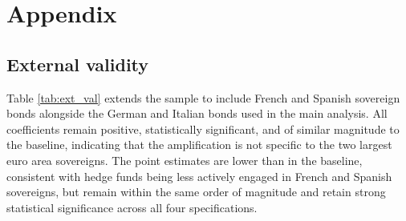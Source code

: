 \documentclass[english, 11pt, oneside]{article}
\renewcommand{\thesection}{\arabic{section}}
\renewcommand{\thesubsection}{\arabic{section}.\arabic{subsection}}
\renewcommand{\thetable}{\Roman{table}}
\begin{document}
\renewcommand{\thepage}{A -- \arabic{page}}
\setcounter{page}{1}

\setcounter{section}{0}
\setcounter{subsection}{0}

\renewcommand{\thesection}{\Alph{section}}
\renewcommand{\thesubsection}{\thesection\arabic{subsection}}

\setcounter{equation}{0}
\renewcommand{\theequation}{\thesection.\arabic{equation}}

\renewcommand\thetable{\Alph{section}\arabic{table}} \setcounter{table}{0}
\renewcommand\thefigure{\Alph{section}\arabic{figure}} \setcounter{figure}{0}


\clearpage
\section{Appendix}
\label{sec:appendix}
\setcounter{figure}{0} 
\setcounter{table}{0}


\subsection{External validity}
\label{subsec:ext_val}

Table \ref{tab:ext_val} extends the sample to include French and Spanish sovereign bonds alongside the German and Italian bonds used in the main analysis. All coefficients remain positive, statistically significant, and of similar magnitude to the baseline, indicating that the amplification is not specific to the two largest euro area sovereigns. The point estimates are lower than in the baseline, consistent with hedge funds being less actively engaged in French and Spanish sovereigns, but remain within the same order of magnitude and retain strong statistical significance across all four specifications. \\
\end{document}
